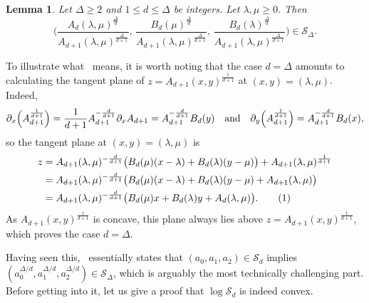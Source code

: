 \documentclass{article}
\numberwithin{equation}{section}
\newcommand\numberthis{\addtocounter{equation}{1}\tag{\theequation}}
\theoremstyle{plain}
\newtheorem{lemma}[theorem]{Lemma}
\theoremstyle{definition}
\theoremstyle{remark} %
\newcommand{\calS}{\mathcal{S}}
\begin{document}
\begin{lemma}\label{lem:Sn-membership-separately}
    Let \(\Delta\ge2\) and \(1\le d\le \Delta\) be integers. Let \(\lambda,\mu\ge0\). Then
    \[
        \biggl(
        \frac{A_{d}(\lambda,\mu)^{\frac{\Delta}{d}}}{A_{d+1}(\lambda,\mu)^{\frac{\Delta}{d+1}}},\,
        \frac{B_{d}(\mu)^{\frac{\Delta}{d}}}{A_{d+1}(\lambda,\mu)^{\frac{\Delta}{d+1}}},\,
        \frac{B_{d}(\lambda)^{\frac{\Delta}{d}}}{A_{d+1}(\lambda,\mu)^{\frac{\Delta}{d+1}}}
        \biggr) \in \calS_\Delta.
    \]
\end{lemma}

To illustrate what~ means, it is worth noting that the case $d=\Delta$ amounts to calculating the tangent plane of $z=A_{d+1}(x,y)^{\frac{1}{d+1}}$ at $(x,y)=(\lambda,\mu)$. Indeed,
\[
    \partial_x \Bigl(A_{d+1}^{\frac{1}{d+1}}\Bigr) = \frac{1}{d+1}A_{d+1}^{-\frac{d}{d+1}}\partial_x A_{d+1} = A_{d+1}^{-\frac{d}{d+1}}B_d(y)
    \quad\text{and}\quad
    \partial_y\Bigl(A_{d+1}^{\frac{1}{d+1}}\Bigr)=A_{d+1}^{-\frac{d}{d+1}}B_d(x),
\]
so the tangent plane at $(x,y)=(\lambda,\mu)$ is
\begin{align*}\label{eq:tangent_plane}
   z
   &= A_{d+1}(\lambda,\mu)^{-\frac{d}{d+1}}\big(B_d(\mu)(x-\lambda) + B_d(\lambda)(y-\mu)\big) + A_{d+1}(\lambda,\mu)^{\frac{1}{d+1}} \\
   &= A_{d+1}(\lambda,\mu)^{-\frac{d}{d+1}}\big(B_d(\mu)(x-\lambda) + B_d(\lambda)(y-\mu) + A_{d+1}(\lambda,\mu)\big)\\
   &=  A_{d+1}(\lambda,\mu)^{-\frac{d}{d+1}} \big(B_d(\mu)x + B_d(\lambda)y +A_{d}(\lambda,\mu)\big). \numberthis
\end{align*}
As $A_{d+1}(x,y)^{\frac{1}{d+1}}$ is concave, this plane always lies above $z=A_{d+1}(x,y)^{\frac{1}{d+1}}$, which proves the case $d=\Delta$.

Having seen this,~ essentially states that $(a_0,a_1,a_2)\in \calS_d$ implies $(a_0^{\Delta/d},a_1^{\Delta/d},a_2^{\Delta/d})\in \calS_{\Delta}$, which is arguably the most technically challenging part. Before getting into it, let us give a proof that \(\log \calS_d\) is indeed convex. 
\end{document}
